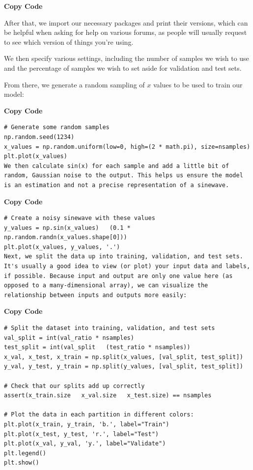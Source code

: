 \medskip

\textbf{\medskip \textbf{Copy Code}}

\medskip

After that, we import our necessary packages and print their versions, which can be helpful when asking for help on various forums, as people will usually request to see which version of things you’re using.

We then specify various settings, including the number of samples we wish to use and the percentage of samples we wish to set aside for validation and test sets.

From there, we generate a random sampling of $x$ values to be used to train our model:



\medskip

 \textbf{\medskip \textbf{Copy Code}}
 
\begin{lstlisting}
# Generate some random samples
np.random.seed(1234)
x_values = np.random.uniform(low=0, high=(2 * math.pi), size=nsamples)
plt.plot(x_values)
We then calculate sin(x) for each sample and add a little bit of random, Gaussian noise to the output. This helps us ensure the model is an estimation and not a precise representation of a sinewave.
\end{lstlisting}


\medskip

 \textbf{\medskip \textbf{Copy Code}}
 
\begin{lstlisting}
# Create a noisy sinewave with these values
y_values = np.sin(x_values)   (0.1 * np.random.randn(x_values.shape[0]))
plt.plot(x_values, y_values, '.')
Next, we split the data up into training, validation, and test sets. It's usually a good idea to view (or plot) your input data and labels, if possible. Because input and output are only one value here (as opposed to a many-dimensional array), we can visualize the relationship between inputs and outputs more easily:
\end{lstlisting}



\medskip

 \textbf{\medskip \textbf{Copy Code}}
 
 
\begin{lstlisting}
# Split the dataset into training, validation, and test sets
val_split = int(val_ratio * nsamples)
test_split = int(val_split   (test_ratio * nsamples))
x_val, x_test, x_train = np.split(x_values, [val_split, test_split])
y_val, y_test, y_train = np.split(y_values, [val_split, test_split])

# Check that our splits add up correctly
assert(x_train.size   x_val.size   x_test.size) == nsamples

# Plot the data in each partition in different colors:
plt.plot(x_train, y_train, 'b.', label="Train")
plt.plot(x_test, y_test, 'r.', label="Test")
plt.plot(x_val, y_val, 'y.', label="Validate")
plt.legend()
plt.show()
\end{lstlisting}

